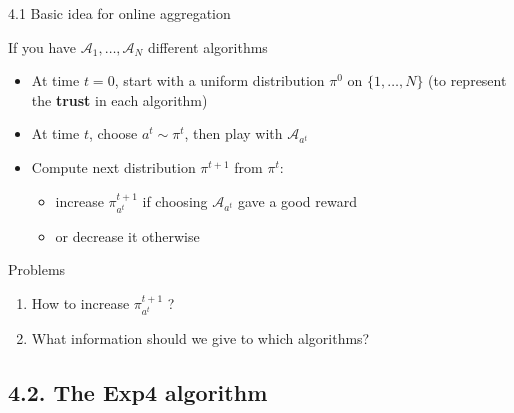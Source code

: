 \documentclass[12pt,english,ignorenonframetext,]{beamer}
\providecommand{\tightlist}{%
  \setlength{\itemsep}{0pt}\setlength{\parskip}{0pt}}
\begin{document}
\begin{frame}{4.1 Basic idea for online aggregation}

If you have \(\mathcal{A}_1,\ldots,\mathcal{A}_N\) different algorithms

\begin{itemize}
\tightlist
\item
  At time \(t=0\), start with a uniform distribution \(\pi^0\) on
  \(\{1,\ldots,N\}\) (to represent the \textbf{trust} in each algorithm)
\item
  At time \(t\), choose \(a^t \sim \pi^t\), then play with
  \(\mathcal{A}_{a^t}\)
\item
  Compute next distribution \(\pi^{t+1}\) from \(\pi^t\):

  \begin{itemize}
  \tightlist
  \item
    increase \(\pi^{t+1}_{a^t}\) if choosing \(\mathcal{A}_{a^t}\) gave
    a good reward
  \item
    or decrease it otherwise
  \end{itemize}
\end{itemize}

\begin{block}{Problems}

\begin{enumerate}
[1.]
\tightlist
\item
  How to increase \(\pi^{t+1}_{a^t}\) ?
\item
  What information should we give to which algorithms?
\end{enumerate}

\end{block}

\end{frame}



\subsection{\hfill{}4.2. The Exp4 algorithm\hfill{}}
\end{document}
